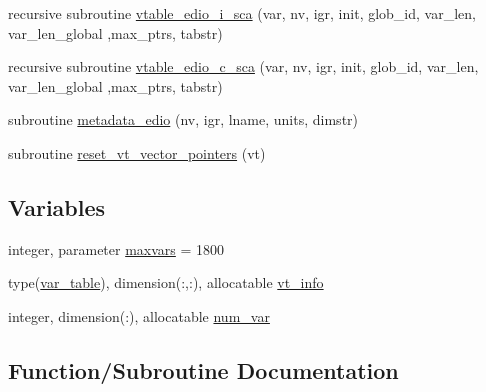 \begin{DoxyCompactItemize}
\item 
recursive subroutine \hyperlink{namespaceed__var__tables_a9729653cf659295bb68d54f3979f7615}{vtable\+\_\+edio\+\_\+i\+\_\+sca} (var, nv, igr, init, glob\+\_\+id, var\+\_\+len, var\+\_\+len\+\_\+global                                                                                                                                                                       ,max\+\_\+ptrs, tabstr)
\item 
recursive subroutine \hyperlink{namespaceed__var__tables_a9bcc45986b101b7495287ad999e5d52e}{vtable\+\_\+edio\+\_\+c\+\_\+sca} (var, nv, igr, init, glob\+\_\+id, var\+\_\+len, var\+\_\+len\+\_\+global                                                                                                                                                                       ,max\+\_\+ptrs, tabstr)
\item 
subroutine \hyperlink{namespaceed__var__tables_a163fc43f01ed02a236a290d4b1d9575b}{metadata\+\_\+edio} (nv, igr, lname, units, dimstr)
\item 
subroutine \hyperlink{namespaceed__var__tables_aed76c1293872b5f6cf4c39c0747d2bb4}{reset\+\_\+vt\+\_\+vector\+\_\+pointers} (vt)
\end{DoxyCompactItemize}
\subsection*{Variables}
\begin{DoxyCompactItemize}
\item 
integer, parameter \hyperlink{namespaceed__var__tables_a932cd6738531dd3348d40636bd8a20ae}{maxvars} = 1800
\item 
type(\hyperlink{structed__var__tables_1_1var__table}{var\+\_\+table}), dimension(\+:,\+:), allocatable \hyperlink{namespaceed__var__tables_a949fa9110a835bd59e16bd0a5e153498}{vt\+\_\+info}
\item 
integer, dimension(\+:), allocatable \hyperlink{namespaceed__var__tables_ae879757190201e461d3bc09131321a64}{num\+\_\+var}
\end{DoxyCompactItemize}


\subsection{Function/\+Subroutine Documentation}
